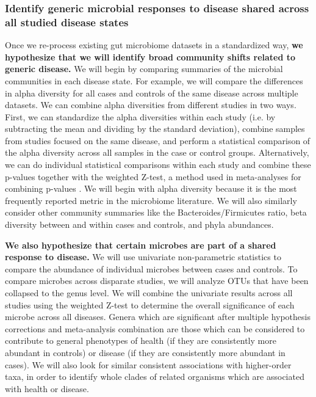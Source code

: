 \documentclass[12pt]{article}
\begin{document}
\subsubsection{Identify generic microbial responses to disease shared across all studied disease states}\label{sec:indep_studies}
Once we re-process existing
gut microbiome datasets in a standardized way, \textbf{we hypothesize that we
will identify broad community shifts related to generic disease.}
We will begin by comparing summaries of the microbial communities in 
each disease state. For example, we will compare the differences in alpha diversity 
for all cases and controls of the same disease across multiple datasets. 
We can combine alpha diversities from different studies in two ways.
First, we can standardize the alpha diversities within each study
(i.e. by subtracting the mean and dividing by the standard deviation), combine samples from
studies focused on the same disease, and perform a statistical comparison of
the alpha diversity across all samples in the case or control groups.
 Alternatively, we can
do individual statistical comparisons within each study and combine these p-values
together with the weighted Z-test, a method used in meta-analyses for combining p-values \cite{zavkin-ztest-2011}. We will begin with alpha diversity
because it is the most frequently reported metric in the microbiome literature. We will also similarly consider
other community summaries like the Bacteroides/Firmicutes ratio, beta diversity between and within cases and controls, 
and phyla abundances.

\textbf{We also hypothesize that certain microbes are part of a shared response to disease.} We will use univariate non-parametric statistics to compare the
abundance of individual microbes between cases and controls. 
To compare microbes across disparate studies, we will analyze OTUs
that have been collapsed to the genus level.
We will combine the univariate results across all studies using 
the weighted Z-test \cite{zavkin-ztest-2011} to determine the overall significance
of each microbe across all diseases. 
Genera which are significant after multiple hypothesis corrections
and meta-analysis combination are those which can be considered
to contribute to general phenotypes of health (if they are
consistently more abundant in controls) or disease (if they are
consistently more abundant in cases). We will also look for
similar consistent associations with higher-order taxa, in order
to identify whole clades of related organisms which are 
associated with health or disease.
\end{document}
